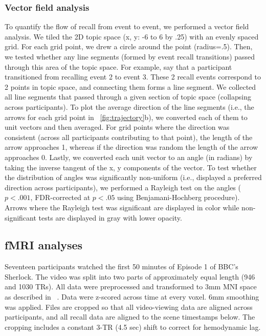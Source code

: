 \documentclass{article}
\begin{document}
\subsubsection{Vector field analysis}
To quantify the flow of recall from event to event, we performed a vector field analysis.  We tiled the 2D topic space (x, y: -6 to 6 by .25) with an evenly spaced grid. For each grid point, we drew a circle around the point (radius=.5). Then, we tested whether any line segments (formed by event recall transitions) passed through this area of the topic space.  For example, say that a participant transitioned from recalling event 2 to event 3. These 2 recall events correspond to 2 points in topic space, and connecting them forms a line segment. We collected all line segments that passed through a given section of topic space (collapsing across participants). To plot the average direction of the line segments (i.e., the arrows for each grid point in ~\ref{fig:trajectory}b), we converted each of them to unit vectors and then averaged. For grid points where the direction was consistent (across all participants contributing to that point), the length of the arrow approaches 1, whereas if the direction was random the length of the arrow approaches 0. Lastly, we converted each unit vector to an angle (in radians) by taking the inverse tangent of the x, y components of the vector. To test whether the distribution of angles was significantly non-uniform (i.e., displayed a preferred direction across participants), we performed a Rayleigh test on the angles ($p<.001$, FDR-corrected at $p<.05$ using Benjamani-Hochberg procedure). Arrows where the Rayleigh test was significant are displayed in color while non-significant tests are displayed in gray with lower opacity.

\subsection{fMRI analyses}
Seventeen participants watched the first 50 minutes of Episode 1 of BBC's Sherlock. The video was split into two parts of approximately equal length (946 and 1030 TRs). All data were preprocessed and transformed to 3mm MNI space as described in ~\citep{ChenEtal17}. Data were z-scored across time at every voxel. 6mm smoothing was applied.
Files are cropped so that all video-viewing data are aligned across participants, and all recall data are aligned to the scene timestamps below. The cropping includes a constant 3-TR (4.5 sec) shift to correct for hemodynamic lag.
\end{document}
